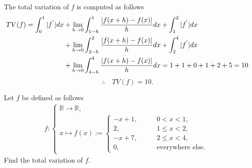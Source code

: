 \documentclass[12pt]{article}
\begin{document}
The total variation of $f$ is computed as follows
\begin{equation}
	\begin{aligned}
		TV(f)   = \int_{0}^1|f^{'}|dx                                                                
		 & + \lim_{h\to 0} \int_{1-h}^1\frac{|f(x+h) - f(x)|}{h}dx
		+\int_{1}^2|f^{'}|dx                                                                    \\
		 & + \lim_{h\to 0} \int_{2-h}^{2}\frac{|f(x+h) - f(x)|}{h}dx  +  \int_{2}^{4}|f^{'}|dx  \\
		 & + \lim_{h\to 0} \int_{4-h}^{4}\frac{|f(x+h) - f(x)|}{h}dx                           
		= 1 + 1 + 0 + 1 + 2 + 5  = 10 \notag
	\end{aligned}
\end{equation}
\begin{equation}
	\therefore\quad
	\boxed{
		TV(f) = 10.
	}
\end{equation}
\begin{example}
	Let $f$ be defined as follows
	\begin{align}
		f:
		\begin{cases}
			\mathbb{R} \rightarrow \mathbb{R}, \\
			x \mapsto
			f(x) := 
			\begin{cases}
				-x+1, \quad & \quad  0<x<1,                 \\
				2, \quad    & \quad  1\leq x < 2,           \\
				-x+7, \quad & \quad  2\leq x < 4,           \\
				0, \quad    & \quad \text{everywhere else}.
			\end{cases}
		\end{cases}
	\end{align}
	Find the total variation of $f$.
\end{example}
\end{document}
